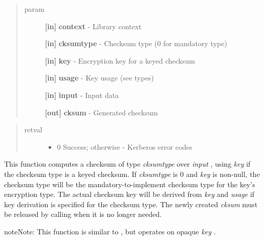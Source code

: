 \documentclass[letterpaper,10pt,english]{sphinxmanual}
\begin{document}
\begin{quote}\begin{description}
\item[{param}] \leavevmode
\textbf{{[}in{]}} \textbf{context} - Library context

\textbf{{[}in{]}} \textbf{cksumtype} - Checksum type (0 for mandatory type)

\textbf{{[}in{]}} \textbf{key} - Encryption key for a keyed checksum

\textbf{{[}in{]}} \textbf{usage} - Key usage (see  types)

\textbf{{[}in{]}} \textbf{input} - Input data

\textbf{{[}out{]}} \textbf{cksum} - Generated checksum

\end{description}\end{quote}
\begin{quote}\begin{description}
\item[{retval}] \leavevmode\begin{itemize}
\item {} 
0   Success; otherwise - Kerberos error codes

\end{itemize}

\end{description}\end{quote}

This function computes a checksum of type \emph{cksumtype} over \emph{input} , using \emph{key} if the checksum type is a keyed checksum. If \emph{cksumtype} is 0 and \emph{key} is non-null, the checksum type will be the mandatory-to-implement checksum type for the key's encryption type. The actual checksum key will be derived from \emph{key} and \emph{usage} if key derivation is specified for the checksum type. The newly created \emph{cksum} must be released by calling {\hyperref[appdev/refs/api/krb5_free_checksum_contents:c.krb5_free_checksum_contents]{}} when it is no longer needed.




{\hyperref[appdev/refs/api/krb5_c_verify_checksum:c.krb5_c_verify_checksum]{}}



\begin{notice}{note}{Note:}
This function is similar to {\hyperref[appdev/refs/api/krb5_c_make_checksum:c.krb5_c_make_checksum]{}} , but operates on opaque \emph{key} .
\end{notice}
\end{document}
